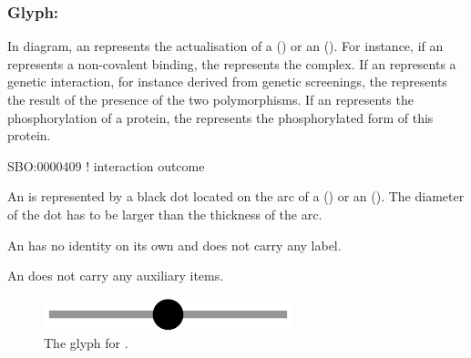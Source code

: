 
\color{blue}
\subsubsection{Glyph: }\label{sec:outcome}

In \ER diagram, an  represents the actualisation of a  () or an  (). For instance, if an  represents a non-covalent binding, the  represents the complex. If an  represents a genetic interaction, for instance derived from genetic screenings, the  represents the result of the presence of the two polymorphisms. If an  represents the phosphorylation of a protein, the  represents the phosphorylated form of this protein.

\begin{glyphDescription}

\glyphSboTerm SBO:0000409 ! interaction outcome

\glyphContainer  An  is represented by a black dot located on the arc of a  () or an  (). The diameter of the dot has to be larger than the thickness of the arc.

\glyphLabel An  has no identity on its own and does not carry any label. 

\glyphAux An  does not carry any auxiliary items.

\end{glyphDescription}

\begin{figure}[H]
  \centering
  \includegraphics[scale = 0.5]{images/outcome}
  \caption{The \ER glyph for .}
  \label{fig:outcome}
\end{figure}

